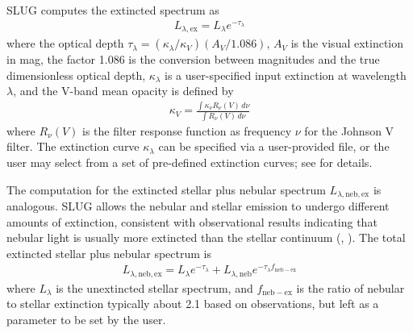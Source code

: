 \documentclass[letterpaper,10pt,english]{sphinxmanual}
\begin{document}
SLUG computes the extincted spectrum as
\begin{equation*}
\begin{split}L_{\lambda,\mathrm{ex}} = L_{\lambda} e^{-\tau_\lambda}\end{split}
\end{equation*}
where the optical depth \(\tau_\lambda = (\kappa_\lambda / \kappa_V) (A_V/1.086)\), \(A_V\) is the visual extinction in mag, the factor 1.086 is the conversion between magnitudes and the true dimensionless optical depth, \(\kappa_\lambda\) is a user-specified input extinction at wavelength \(\lambda\), and the V-band mean opacity is defined by
\begin{equation*}
\begin{split}\kappa_V = \frac{\int \kappa_\nu R_\nu(V) \, d\nu}{\int R_\nu(V) \, d\nu}\end{split}
\end{equation*}
where \(R_\nu(V)\) is the filter response function as frequency \(\nu\) for the Johnson V filter. The extinction curve \(\kappa_\lambda\) can be specified via a user-provided file, or the user may select from a set of pre-defined extinction curves; see {\hyperref[\detokenize{parameters:ssec-extinction-keywords}]{}} for details.

The computation for the extincted stellar plus nebular spectrum \(L_{\lambda,\mathrm{neb,ex}}\) is analogous. SLUG allows the nebular and stellar emission to undergo different amounts of extinction, consistent with observational results indicating that nebular light is usually more extincted than the stellar continuum (, ). The total extincted stellar plus nebular spectrum is
\begin{equation*}
\begin{split}L_{\lambda,\mathrm{neb,ex}} = L_{\lambda} e^{-\tau_\lambda} + L_{\lambda,\mathrm{neb}} e^{-\tau_\lambda f_{\mathrm{neb-ex}}}\end{split}
\end{equation*}
where \(L_{\lambda}\) is the unextincted stellar spectrum, and \(f_{\mathrm{neb-ex}}\) is the ratio of nebular to stellar extinction \textendash{} typically about 2.1 based on observations, but left as a parameter to be set by the user.
\end{document}
